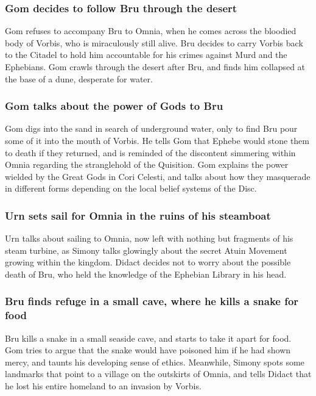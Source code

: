 \subsubsection{\Gls{Gom} decides to follow \Gls{Bru} through the desert}
\Gls{Gom} refuses to accompany \Gls{Bru} to Omnia, when he comes across the bloodied body of
\Gls{Vorbis}, who is miraculously still alive. \Gls{Bru} decides to carry \Gls{Vorbis} back to the
Citadel to hold him accountable for his crimes against \Gls{Murd} and the Ephebians. \Gls{Gom}
crawls through the desert after \Gls{Bru}, and finds him collapsed at the base of a dune, desperate
for water.

\subsubsection{\Gls{Gom} talks about the power of Gods to \Gls{Bru}}
\Gls{Gom} digs into the sand in search of underground water, only to find \Gls{Bru} pour some of it
into the mouth of \Gls{Vorbis}. He tells \Gls{Gom} that Ephebe would stone them to death if they
returned, and is reminded of the discontent simmering within Omnia regarding the stranglehold of
the Quisition. \Gls{Gom} explains the power wielded by the Great Gods in Cori Celesti, and talks
about how they masquerade in different forms depending on the local belief systems of the Disc.

\subsubsection{\Gls{Urn} sets sail for Omnia in the ruins of his steamboat}
\Gls{Urn} talks about sailing to Omnia, now left with nothing but fragments of his steam turbine,
as \Gls{Simony} talks glowingly about the secret \Gls{Atuin} Movement growing within the kingdom.
\Gls{Didact} decides not to worry about the possible death of \Gls{Bru}, who held the knowledge of
the Ephebian Library in his head.

\subsubsection{\Gls{Bru} finds refuge in a small cave, where he kills a snake for food}
\Gls{Bru} kills a snake in a small seaside cave, and starts to take it apart for food. \Gls{Gom}
tries to argue that the snake would have poisoned him if he had shown mercy, and taunts his
developing sense of ethics. Meanwhile, \Gls{Simony} spots some landmarks that point to a village on
the outskirts of Omnia, and tells \Gls{Didact} that he lost his entire homeland to an invasion by
\Gls{Vorbis}.

